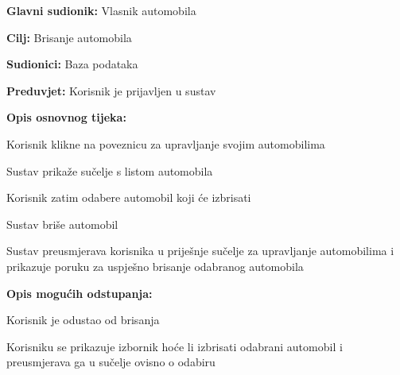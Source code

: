 					\noindent {}
					\begin{packed_item}
						
						\item \textbf{Glavni sudionik: } Vlasnik automobila
						\item  \textbf{Cilj:} Brisanje automobila
						\item  \textbf{Sudionici:} Baza podataka
						\item  \textbf{Preduvjet:} Korisnik je prijavljen u sustav
						\item  \textbf{Opis osnovnog tijeka:}
						
						\item[] \begin{packed_enum}
							
							\item Korisnik klikne na poveznicu za upravljanje svojim automobilima
							\item Sustav prikaže sučelje s listom automobila
							\item Korisnik zatim odabere automobil koji će izbrisati
							\item Sustav briše automobil
							\item Sustav preusmjerava korisnika u priješnje sučelje za upravljanje automobilima i prikazuje poruku za uspješno brisanje odabranog automobila
							
						\end{packed_enum}
						\item  \textbf{Opis mogućih odstupanja:}
						
						\item[] \begin{packed_item}
							
							\item[4.a] Korisnik je odustao od brisanja
							\item[] \begin{packed_enum}
								
								\item Korisniku se prikazuje izbornik hoće li izbrisati odabrani automobil i preusmjerava ga u sučelje ovisno o odabiru
								
							\end{packed_enum}
								
							\end{packed_item}
							
					\end{packed_item}
					\noindent {}
